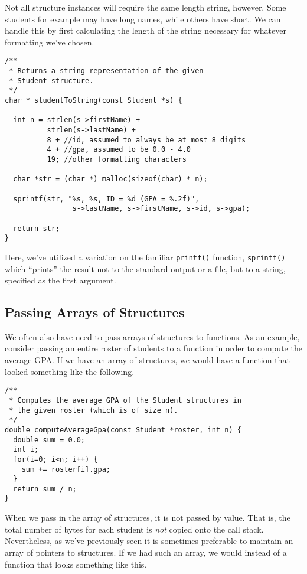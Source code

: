 Not all structure instances will require the same length string, however.
Some students for example may have long names, while others have
short.  We can handle this by first calculating the length of 
the string necessary for whatever formatting we've chosen.

\begin{verbatim}
/**
 * Returns a string representation of the given 
 * Student structure.
 */
char * studentToString(const Student *s) {

  int n = strlen(s->firstName) + 
          strlen(s->lastName) + 
          8 + //id, assumed to always be at most 8 digits
          4 + //gpa, assumed to be 0.0 - 4.0
          19; //other formatting characters
          
  char *str = (char *) malloc(sizeof(char) * n);

  sprintf(str, "%s, %s, ID = %d (GPA = %.2f)", 
                s->lastName, s->firstName, s->id, s->gpa);

  return str;
}
\end{verbatim}

Here, we've utilized a variation on the familiar \texttt{printf()}
function, \texttt{sprintf()} which ``prints'' the result not
to the standard output or a file, but to a string, specified as
the first argument.

\subsection{Passing Arrays of Structures}

We often also have need to pass arrays of structures to functions.
As an example, consider passing an entire roster of students to 
a function in order to compute the average GPA.  If we have an
array of structures, we would have a function that looked something
like the following.

\begin{verbatim}
/**
 * Computes the average GPA of the Student structures in
 * the given roster (which is of size n).
 */
double computeAverageGpa(const Student *roster, int n) {
  double sum = 0.0;
  int i;
  for(i=0; i<n; i++) {
    sum += roster[i].gpa;
  }
  return sum / n;
}
\end{verbatim}

When we pass in the array of structures, it is not passed by
value.  That is, the total number of bytes for each student is
\emph{not} copied onto the call stack.  Nevertheless, as we've
previously seen it is sometimes preferable to maintain an array
of pointers to structures.  If we had such an array, we would instead
of a function that looks something like this.

